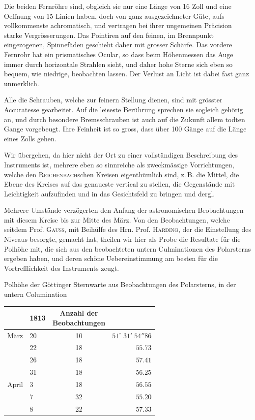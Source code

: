 \par\indent Die beiden Fernröhre sind, obgleich sie nur eine Länge von 16 Zoll und eine
Oeffnung von 15 Linien haben, doch von ganz ausgezeichneter Güte, aufs vollkommenste
achromatisch, und vertragen bei ihrer ungemeinen Präcision starke Vergrösserungen. Das
Pointiren auf den feinen, im Brennpunkt eingezogenen, Spinnefäden geschieht daher mit
grosser Schärfe. Das vordere Fernrohr hat ein prismatisches Ocular, so dass beim
Höhenmessen das Auge immer durch horizontale Strahlen sieht, und daher hohe Sterne sich
eben so bequem, wie niedrige, beobachten lassen. Der Verlust an Licht ist dabei fast ganz
unmerklich.

\par\indent Alle die Schrauben, welche zur feinern Stellung dienen, sind mit grösster
Accuratesse gearbeitet. Auf die leiseste Berührung sprechen sie sogleich gehörig an, und
durch besondere Bremsschrauben ist auch auf die Zukunft allem todten Gange vorgebeugt.
Ihre Feinheit ist so gross, dass über 100 Gänge auf die Länge eines Zolls gehen.

\par\indent Wir übergehen, da hier nicht der Ort zu einer vollständigen Beschreibung des
Instruments ist, mehrere eben so sinnreiche als zweckmässige Vorrichtungen, welche den
\textsc{Reichenbach}schen Kreisen eigenthümlich sind, z.\,B. die Mittel, die Ebene des
Kreises auf das genaueste vertical zu stellen, die Gegenstände mit Leichtigkeit
aufzufinden und in das Gesichtsfeld zu bringen und dergl.

\par\indent Mehrere Umstände verzögerten den Anfang der astronomischen Beobachtungen mit
diesem Kreise bis zur Mitte des März. Von den Beobachtungen, welche seitdem Prof.
\textsc{Gauss}, mit Beihülfe des Hrn. Prof. \textsc{Harding}, der die Einstellung des
Niveaus besorgte, gemacht hat, theilen wir hier als Probe die Resultate für die Polhöhe
mit, die sich aus den beobachteten untern Culminationen des Polarsterns ergeben haben,
und deren schöne Uebereinstimmung am besten für die Vortrefflichkeit des Instruments
zeugt.

\begin{center}Polhöhe der Göttinger Sternwarte aus Beobachtungen des Polarsterns, in der untern Columination\end{center}
\begin{center}\fontsize{10}{12}\selectfont\setlength{\tabcolsep}{7pt}\renewcommand{\arraystretch}{1.15}\begin{tabular}{ll|c|r}
& 1813 & \shortstack{Anzahl der\\Beobachtungen} &\\\hline
März & 20 & 10 & $51^\circ\;31'\;54''86$\\
& 22 & 18 & $55.73$\\
& 26 & 18 & $57.41$\\
& 31 & 18 & $56.25$\\
April & 3 & 18 & $56.55$\\
& 7 & 32 & $55.20$\\
& 8 & 22 & $57.33$\\
\end{tabular}\end{center}

